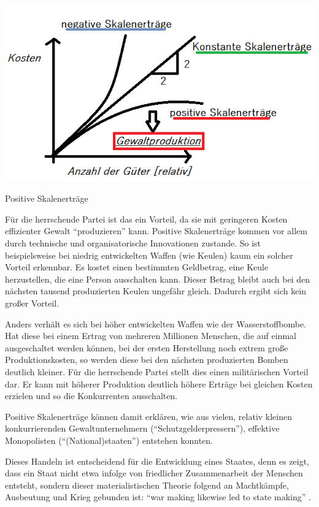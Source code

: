 \begin{dsafigure}
	\begin{center}
	\includegraphics[width=0.9\columnwidth]{img/Skalenertraege.png}
	\caption{Positive Skalenerträge}
	\label{fig:skalenertraege}
	\end{center}
\end{dsafigure}

Für die herrschende Partei ist das ein Vorteil, da sie mit geringeren Kosten effizienter Gewalt ``produzieren'' kann.
Positive Skalenerträge kommen vor allem durch technische und organisatorische Innovationen zustande.
So ist beispielsweise bei niedrig entwickelten Waffen (wie Keulen) kaum ein solcher Vorteil erkennbar.
Es kostet einen bestimmten Geldbetrag, eine Keule herzustellen, die eine Person ausschalten kann.
Dieser Betrag bleibt auch bei den nächsten tausend produzierten Keulen ungefähr gleich.
Dadurch ergibt sich kein großer Vorteil.

Anders verhält es sich bei höher entwickelten Waffen wie der Wasserstoffbombe.
Hat diese bei einem Ertrag von mehreren Millionen Menschen, die auf einmal ausgeschaltet werden können, bei der ersten Herstellung noch extrem große Produktionskosten, so werden diese bei den nächsten produzierten Bomben deutlich kleiner.
Für die herrschende Partei stellt dies einen militärischen Vorteil dar.
Er kann mit höherer Produktion deutlich höhere Erträge bei gleichen Kosten erzielen und so die Konkurrenten ausschalten.

Positive Skalenerträge können damit erklären, wie aus vielen, relativ kleinen konkurrierenden Gewaltunternehmern (``Schutzgelderpressern''), effektive Monopolisten (``(National)staaten'') entstehen konnten.

Dieses Handeln ist entscheidend für die Entwicklung eines Staates, denn es zeigt, dass ein Staat nicht etwa infolge von friedlicher Zusammenarbeit der Menschen entsteht, sondern dieser materialistischen Theorie folgend an Machtkämpfe, Ausbeutung und Krieg gebunden ist: ``war making likewise led to state making'' \parencite[183]{Tilly-1985-aa}.

